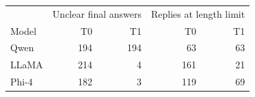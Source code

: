 \begin{tabular}{@{}lrrrr@{}}
\toprule
& \multicolumn{2}{c}{Unclear final answers} & \multicolumn{2}{c}{Replies at length limit} \\
Model & T0 & T1 & T0 & T1 \\
\midrule
Qwen & 194 & 194 & 63 & 63 \\
LLaMA & 214 & 4 & 161 & 21 \\
Phi-4 & 182 & 3 & 119 & 69 \\
\bottomrule
\end{tabular}